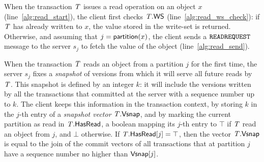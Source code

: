 When the transaction $\mathit{T}$ issues a read operation on an object $x$ (line~\ref{alg:read_start}), the client first checks $\mathit{T}.\mathsf{WS}$ (line~\ref{alg:read_ws_check}): if $\mathit{T}$ has already written to $x$, the value stored in the write-set is returned. Otherwise, and assuming that $j = \mathsf{partition}(x)$, the client sends a ${\tt READREQUEST}$ message to the server $s_j$ to fetch the value of the object (line~\ref{alg:read_send}).

When the transaction $\mathit{T}$ reads an object from a partition $j$ for the first time, the server $s_j$ fixes a \emph{snapshot} of versions from which it will serve all future reads by $\mathit{T}$. This snapshot is defined by an integer $k$: it will include the versions written by all the transactions that committed at the server with a sequence number up to $k$. The client keeps this information in the transaction context, by storing $k$ in the $j$-th entry of a \emph{snapshot vector} $\mathit{T}.\mathsf{Vsnap}$, and by marking the current partition as read in $\mathit{T}.\mathsf{HasRead}$, a boolean mapping its $j$-th entry to $\top$ if $\mathit{T}$ read an object from $j$, and $\bot$ otherwise. If $\mathit{T}.\mathsf{HasRead}[j]=\top$, then the vector $\mathit{T}.\mathsf{Vsnap}$ is equal to the join of the commit vectors of all transactions that at partition $j$ have a sequence number no higher than $\mathsf{Vsnap}[j]$.

